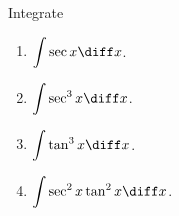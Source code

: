 Integrate 
\begin{enumerate}
\item \label{problemintsecxdx} $\displaystyle \int \sec x  \diff x$.

\item \label{problemintsec^3xdx} $\displaystyle \int \sec^3x  \diff x$.

\item $\displaystyle \int \tan^3x \diff x$.

\item $\displaystyle \int \sec^2x\tan^2x \diff x$.

\end{enumerate}
